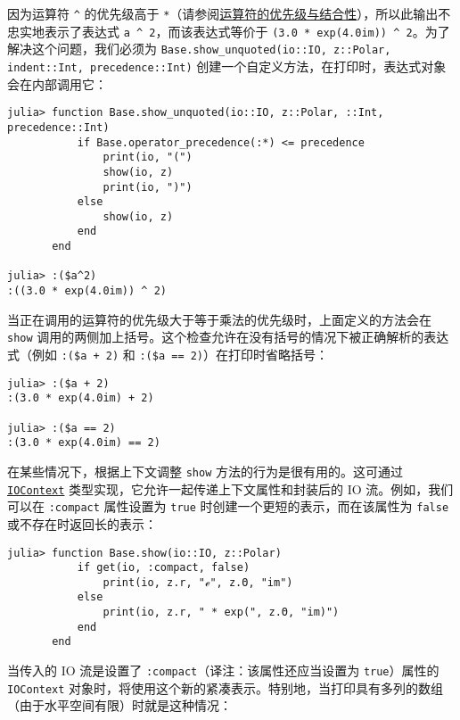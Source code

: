 因为运算符 \texttt{{\textasciicircum}} 的优先级高于 \texttt{*}（请参阅\hyperlink{1006859879084707050}{运算符的优先级与结合性}），所以此输出不忠实地表示了表达式 \texttt{a {\textasciicircum} 2}，而该表达式等价于 \texttt{(3.0 * exp(4.0im)) {\textasciicircum} 2}。为了解决这个问题，我们必须为 \texttt{Base.show\_unquoted(io::IO, z::Polar, indent::Int, precedence::Int)} 创建一个自定义方法，在打印时，表达式对象会在内部调用它：




\begin{verbatim}
julia> function Base.show_unquoted(io::IO, z::Polar, ::Int, precedence::Int)
           if Base.operator_precedence(:*) <= precedence
               print(io, "(")
               show(io, z)
               print(io, ")")
           else
               show(io, z)
           end
       end

julia> :($a^2)
:((3.0 * exp(4.0im)) ^ 2)
\end{verbatim}



当正在调用的运算符的优先级大于等于乘法的优先级时，上面定义的方法会在 \texttt{show} 调用的两侧加上括号。这个检查允许在没有括号的情况下被正确解析的表达式（例如 \texttt{:(\$a + 2)} 和 \texttt{:(\$a == 2)}）在打印时省略括号：




\begin{verbatim}
julia> :($a + 2)
:(3.0 * exp(4.0im) + 2)

julia> :($a == 2)
:(3.0 * exp(4.0im) == 2)
\end{verbatim}



在某些情况下，根据上下文调整 \texttt{show} 方法的行为是很有用的。这可通过 \hyperlink{13454403377667762339}{\texttt{IOContext}} 类型实现，它允许一起传递上下文属性和封装后的 IO 流。例如，我们可以在 \texttt{:compact} 属性设置为 \texttt{true} 时创建一个更短的表示，而在该属性为 \texttt{false} 或不存在时返回长的表示：




\begin{verbatim}
julia> function Base.show(io::IO, z::Polar)
           if get(io, :compact, false)
               print(io, z.r, "ℯ", z.Θ, "im")
           else
               print(io, z.r, " * exp(", z.Θ, "im)")
           end
       end
\end{verbatim}



当传入的 IO 流是设置了 \texttt{:compact}（译注：该属性还应当设置为 \texttt{true}）属性的 \texttt{IOContext} 对象时，将使用这个新的紧凑表示。特别地，当打印具有多列的数组（由于水平空间有限）时就是这种情况：




